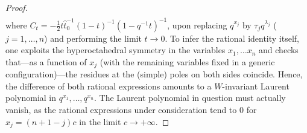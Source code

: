 \documentclass[reqno]{amsart}
\theoremstyle{remark}
\numberwithin{equation}{section}
\begin{document}
\begin{proof}
\begin{align*}
\end{align*}
where $C_t=-\frac{1}{2}t \hat{t}_0^{-1}(1-t)^{-1}(1-q^{-1}t)^{-1}$, upon replacing
$q^{x_j}$ by $\tau_jq^{\lambda_j}$ ($j=1,\ldots ,n$) and
performing the limit $t\to 0$. To infer the rational identity itself, one exploits
the hyperoctahedral symmetry in the variables $x_1,\ldots x_n$ and checks that---as a function of $x_j$ (with the remaining variables fixed in a generic configuration)---the residues at the (simple) poles on both sides coincide. Hence, the difference of both rational expressions amounts to a $W$-invariant Laurent polynomial in $q^{x_1},\ldots ,q^{x_n}$.
The Laurent polynomial in question must actually vanish, as the rational expressions under consideration tend to $0$
for $x_j=(n+1-j)c$ in the limit $c\to +\infty$.
\end{proof}
\end{document}
